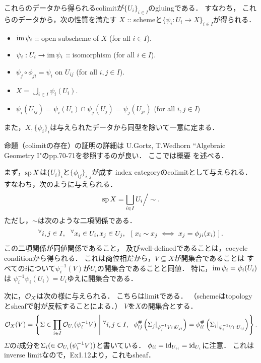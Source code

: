 \documentclass[a4paper]{jsarticle}
\begin{document}
    これらのデータから得られるcolimitが$\{U_i\}_{i \in I}$のgluingである．
    すなわち，
    これらのデータから，次の性質を満たす
    $X$ :: schemeと$\{\psi_i: U_i \to X\}_{i \in I}$が得られる．
    \begin{itemize}
        \item $\operatorname{im} \psi_i$ :: open subscheme of $X$ (for all $i \in I$).
        \item $\psi_i: U_i \to \operatorname{im} \psi_i$ :: isomorphism (for all $i \in I$).
        \item $\psi_j \circ \phi_{ji}=\psi_i$ on $U_{ij}$ (for all $i,j \in I$).
        \item $X=\bigcup_{i \in I} \psi_i(U_i)$.
        \item $\psi_i(U_{ij})=\psi_i(U_i) \cap \psi_j(U_j)=\psi_j(U_{ji})$ (for all $i,j \in I$)
    \end{itemize}
    また，$X, \{\psi_i\}_i$は与えられたデータから同型を除いて一意に定まる．

    命題（colimitの存在）の証明の詳細は
    U.Gortz, T.Wedhorn ``Algebraic Geometry I"のpp.70-71を参照するのが良い．
    ここでは概要
    を述べる．

    まず，$\operatorname{sp} X$は$\{ U_i \}_i$と$\{ \phi_{ij} \}_{i,j}$が成す
    index categoryのcolimitとして与えられる．
    すなわち，次のように与えられる．
    \[ \operatorname{sp} X=\bigsqcup_{i \in I} U_i \Big/ \sim. \]
    ただし，$\sim$は次のような二項関係である．
    \[
        {}^{\forall} i,j \in I,~~
        {}^{\forall} x_i \in U_i, x_j \in U_j,~~
        \left[~ x_i \sim x_j \iff x_j=\phi_{ji}(x_i) ~\right].
    \]
    この二項関係が同値関係であること，
    及びwell-definedであることは，cocycle conditionから得られる．
    これは商位相だから，$V \subseteq X$が開集合であることは
    すべての$i$について$\psi_i^{-1}(V)$が$U_i$の開集合であることと同値．
    特に，$\operatorname{im} \psi_i=\psi_i(U_i)$は
    $\psi_i^{-1}\psi_i(U_i)=U_i$ゆえに開集合である．

    次に，$\mathcal{O}_X$は次の様に与えられる．
    こちらはlimitである．
    （schemeはtopologyとsheafで射が反転することによる．）
    $V$を$X$の開集合とする．
    \[
        \mathcal{O}_X(V)=
        \left\{
            \Sigma \in \prod_{i \in I} \mathcal{O}_{U_i}(\psi_i^{-1}V)
            ~\middle|~
            {}^{\forall} i,j \in I,~~
            \phi^{\#}_{ij} \left( \Sigma_j|_{\psi_j^{-1}V \cap U_{ji}} \right)=\phi^{\#}_{ii} \left( \Sigma_i|_{\psi_i^{-1}V \cap U_{ij}} \right)
        \right\}.
    \]
    $\Sigma$の$i$成分を$\Sigma_i (\in \mathcal{O}_{U_i}(\psi_i^{-1}V))$と書いている．
    $\phi_{ii}=\mathrm{id}_{U_{ii}}=\mathrm{id}_{U_i}$に注意．
    これはinverse limitなので，Ex1.12より，これもsheaf．
\end{document}
